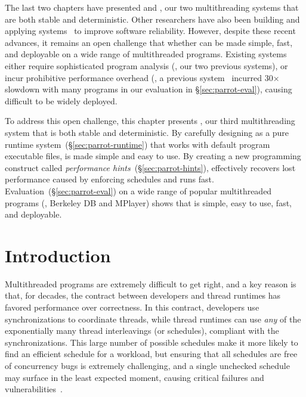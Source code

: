 The last two chapters have presented \tern and \peregrine, our two 
multithreading systems that are both stable and deterministic. Other 
researchers have also been building and applying \smt 
systems~\cite{determinator:osdi10, dthreads:sosp11, bergan:oopsla13} to improve 
software reliability. However, despite these recent advances, it remains an 
open challenge that whether \smt can be made simple, fast, and deployable on a 
wide range of multithreaded programs. Existing systems either require 
sophisticated program analysis (\eg, our two previous systems), or incur 
prohibitive performance overhead (\eg, a previous system~\cite{dthreads:sosp11} 
incurred 30$\times$ slowdown with many programs in our evaluation in 
\S\ref{sec:parrot-eval}), causing \smt difficult to be widely deployed.

To address this open challenge, this chapter presents \parrot, our third 
multithreading system that is both stable and deterministic. By carefully 
designing \parrot as a pure runtime system~(\S\ref{sec:parrot-runtime}) that 
works with default program executable files, \smt is made simple and easy to 
use. By creating a new programming construct called \emph{performance 
hints}~(\S\ref{sec:parrot-hints}), \parrot effectively recovers lost 
performance caused by enforcing \smt schedules and runs fast. 
Evaluation~(\S\ref{sec:parrot-eval}) on a wide range of \nprog popular 
multithreaded programs (\eg, Berkeley DB and MPlayer) shows that \parrot is 
simple, easy to use, fast, and deployable.

\section{Introduction} \label{sec:parrot-intro}

Multithreaded programs are extremely difficult to get right, and a key reason 
is that, for decades, the contract between developers and thread runtimes has 
favored performance over correctness.  In this contract, developers use 
synchronizations to coordinate threads, while thread runtimes can
use \emph{any} of the exponentially many thread interleavings (or schedules), 
compliant with the synchronizations.  This large number of possible schedules 
make it more likely to find an efficient schedule for a workload, but ensuring
that all schedules are free of concurrency bugs is extremely challenging, and a 
single unchecked schedule may surface in the least expected moment, causing 
critical failures and vulnerabilities~\cite{therac25-investigation, 
northeast-blackout, lu:concurrency-bugs,con:hotpar12}.

